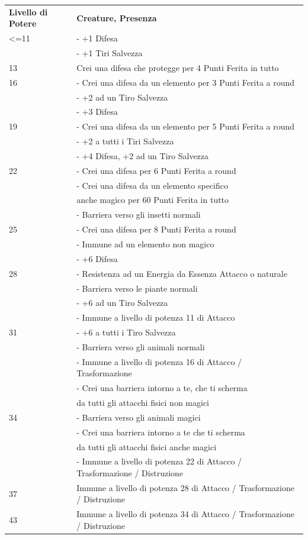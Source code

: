 \documentclass[a4paper,11pt,twoside,openany]{book}
\begin{document}
	\bigskip
	
	\begin{tabular}{L{3cm} L{13cm}}
		\toprule
		\textbf{Livello di Potere} & \textbf{Creature, Presenza}\tabularnewline
		<=11 & - +1 Difesa\\
		& - +1 Tiri Salvezza \\
		13 & Crei una difesa che protegge per 4 Punti Ferita in tutto \\
		16 & - Crei una difesa da un elemento per 3 Punti Ferita a round \\
		& - +2 ad un Tiro Salvezza\\
		& - +3 Difesa\\
		19 & - Crei una difesa da un elemento per 5 Punti Ferita a round\\
		& - +2 a tutti i Tiri Salvezza\\
		& - +4 Difesa, +2 ad un Tiro Salvezza\\
		22 &- Crei una difesa per 6 Punti Ferita a round\\
		& - Crei una difesa da un elemento specifico\\
		&anche magico per 60 Punti Ferita in tutto\\
		& - Barriera verso gli insetti normali\\
		25 &- Crei una difesa per 8 Punti Ferita a round\\
		&- Immune ad un elemento non magico\\
		&- +6 Difesa\\
		28 &- Resistenza ad un Energia da Essenza Attacco o naturale\\
		&- Barriera verso le piante normali\\
		&- +6 ad un Tiro Salvezza\\
		&- Immune a livello di potenza 11 di Attacco\\
		31 &- +6 a tutti i Tiro Salvezza\\
		&- Barriera verso gli animali normali\\
		&- Immune a livello di potenza 16 di Attacco / Trasformazione\\
		&- Crei una barriera intorno a te, che ti scherma\\
		& da tutti gli attacchi fisici non magici\\
		34 &- Barriera verso gli animali magici\\
		&- Crei una barriera intorno a te che ti scherma\\
		&da tutti gli attacchi fisici anche magici\\
		&- Immune a livello di potenza 22 di Attacco / Trasformazione / Distruzione\\
		37 &Immune a livello di potenza 28 di Attacco / Trasformazione / Distruzione\\
		43 &Immune a livello di potenza 34 di Attacco / Trasformazione / Distruzione\\
	\end{tabular}
	
\end{document}
